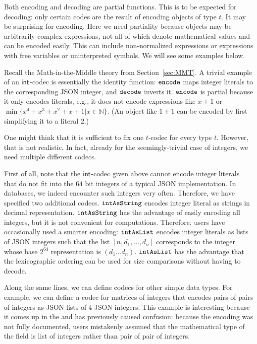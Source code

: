 Both encoding and decoding are partial functions.
This is to be expected for decoding: only certain codes are the result of encoding objects of type $t$.
It may be surprising for encoding.
Here we need partiality because \MMT objects may be arbitrarily complex expressions, not all of which denote mathematical values and can be encoded easily.
This can include non-normalized expressions or expressions with free variables or uninterpreted symbols.
We will see some examples below.

Recall the Math-in-the-Middle theory from Section~\ref{sec:MMT}.
A trivial example of an $\Int$-codec is essentially the identity function: $\enc$ maps integer literals to the corresponding JSON integer, and $\dec$ inverts it.
$\enc$ is partial because it only encodes literals, e.g., it does not encode expressions like $x+1$ or $\min \{x^4+x^3+x^2+x+1|x\in \mathbb{N}\}$.
(An object like $1+1$ can be encoded by first simplifying it to a literal $2$.)

One might think that it is sufficient to fix one $t$-codec for every type $t$.
However, that is not realistic.
In fact, already for the seemingly-trivial case of integers, we need multiple different codecs.

First of all, note that the $\Int$-codec given above cannot encode integer literals that do not fit into the $64$ bit integers of a typical JSON implementation.
In \LMFDB databases, we indeed encounter such integers very often.
Therefore, we have specified two additional codecs.
$\intAsString$ encodes integer literal as strings in decimal representation.
$\intAsString$ has the advantage of easily encoding all integers, but it is not
convenient for computations.  Therefore, \LMFDB users have occasionally used a smarter
encoding: $\intAsList$ encodes integer literals as lists of JSON integers such that the
list $[n,d_1,\ldots,d_n]$ corresponds to the integer whose base $2^{64}$ representation is
$(d_1\ldots d_n)$.  $\intAsList$ has the advantage that the lexicographic ordering can be
used for size comparisons without having to decode.

Along the same lines, we can define codecs for other simple data types.
For example, we can define a codec for matrices of integers that encodes pairs of pairs of integers as JSON lists of $4$ JSON integers.
This example is interesting because it comes up in the \LMFDB and has previously caused confusion: because the encoding was not fully documented, users mistakenly assumed that the mathematical type of the field is list of integers rather than pair of pair of integers.

